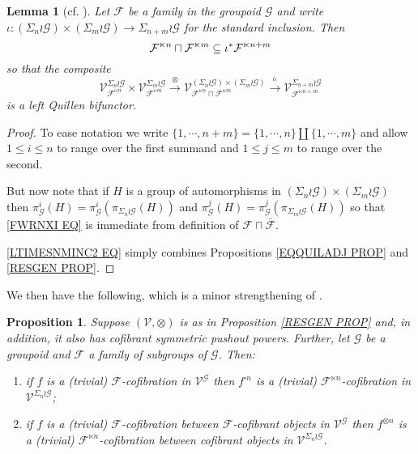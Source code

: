 \documentclass[a4paper,10pt
,draft
]{article}%
\numberwithin{equation}{section}
\numberwithin{figure}{section}
\newtheorem{lemma}[equation]{Lemma}%
\newtheorem{proposition}[equation]{Proposition}%
\theoremstyle{definition} %
\newcommand{\F}{\ensuremath{\mathcal F}}
\newcommand{\V}{\ensuremath{\mathcal V}}
\newcommand{\G}{\ensuremath{\mathcal G}}
\newcommand{\1}{\ensuremath{\mathbbm 1}}%
\begin{document}
\begin{lemma}[cf. {\cite[Prop. 6.22]{BP_geo}}]
\label{LTIMESNMINC LEM}
Let $\F$ be a family in the groupoid $\G$ and write
$\iota \colon \left(\Sigma_n \wr \G\right) \times \left(\Sigma_m \wr \G\right) \to \Sigma_{n+m} \wr \G$ for the standard inclusion.
Then 
\begin{equation}\label{LTIMESNMINC EQ}
\F^{\ltimes n} \sqcap \F^{\ltimes m} \subseteq 
\iota^{\**}
\F^{\ltimes n+m}
\end{equation}
so that the composite
\begin{equation}\label{LTIMESNMINC2 EQ}
	\V^{\Sigma_n \wr \G}_{\F^{\ltimes n}} \times \V^{\Sigma_m \wr \G}_{\F^{\ltimes m}}
\xrightarrow{\otimes}
	\V^{\left(\Sigma_n \wr \G\right) \times \left(\Sigma_m \wr \G\right)}_{\F^{\ltimes n} \sqcap \F^{\ltimes m}}
\xrightarrow{\iota_!}
	\V^{\Sigma_{n+m} \wr \G}_{\F^{\ltimes n+m}}
\end{equation}
is a left Quillen bifunctor.
\end{lemma}



\begin{proof}
To ease notation we write
$\{1,\cdots, n+m\} = \{1,\cdots,n\} \amalg \{1,\cdots,m\}$
and allow $1\leq i\leq n$ to range over the first summand and $1 \leq j \leq m$ to range over the second.

But now note that if $H$ is a group of automorphisms in 
$(\Sigma_n \wr \G) \times (\Sigma_m \wr \G)$
then 
$\pi^i_{\G}(H) = \pi^i_{\G}(\pi_{\Sigma_n \wr \G}(H))$
and
$\pi^j_{\G}(H) = \pi^j_{\G}(\pi_{\Sigma_m \wr \G}(H))$
so that 
\eqref{FWRNXI EQ} is immediate from definition of 
$\F \sqcap \bar{\F}$.

\eqref{LTIMESNMINC2 EQ} simply combines 
Propositions \ref{EQQUILADJ PROP} and \ref{RESGEN PROP}.
\end{proof}





We then have the following, which is a minor strengthening of 
\cite[Prop. 6.24]{BP_geo}.




\begin{proposition}\label{SIGMAWRGF PROP}
Suppose $(\V, \otimes)$ is as in Proposition \ref{RESGEN PROP} and, in addition, it also has cofibrant symmetric pushout powers.
Further, let $\G$ be a groupoid and
$\F$ a family of subgroups of $\G$.
Then:
\begin{enumerate}[label=(\roman*)]
\item if $f$ is a (trivial) $\F$-cofibration in $\V^{\G}$
then $f^{\square n}$ is a (trivial)
$\F^{\ltimes n}$-cofibration in $\V^{\Sigma_n \wr \G}$;
\item if $f$ is a (trivial) $\F$-cofibration between $\F$-cofibrant objects in $\V^{\G}$
then $f^{\otimes n}$ is a (trivial)
$\F^{\ltimes n}$-cofibration
between cofibrant objects in $\V^{\Sigma_n \wr \G}$.
\end{enumerate}
\end{proposition}
\end{document}
